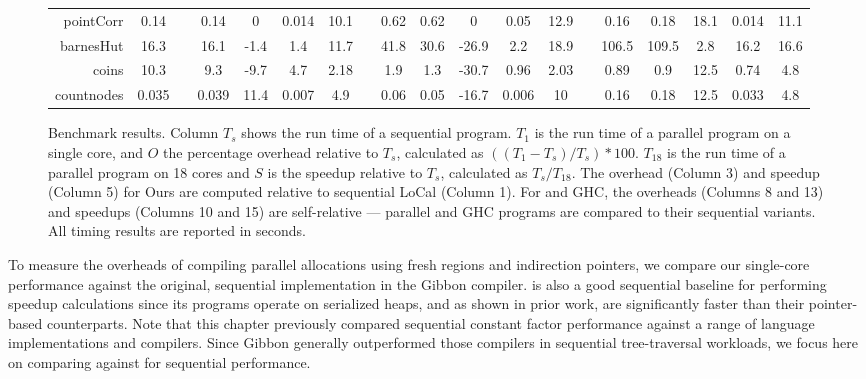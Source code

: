 \begin{figure}
\begin{tabular}{@{}r cc cccc r ccccc r ccccc@{}}
    pointCorr & 0.14 && 0.14 & 0 & 0.014 & 10.1 && 0.62 & 0.62 & 0 & 0.05 & 12.9 && 0.16 & 0.18 & 18.1 & 0.014 & 11.1 \\

    barnesHut & 16.3 && 16.1 & -1.4 & 1.4 & 11.7 && 41.8 & 30.6 & -26.9 & 2.2 & 18.9 && 106.5 & 109.5 & 2.8 & 16.2 & 16.6 \\

    coins & 10.3 && 9.3 & -9.7 & 4.7 & 2.18 && 1.9 & 1.3 & -30.7 & 0.96 & 2.03 && 0.89 & 0.9 & 12.5 & 0.74 & 4.8 \\

    countnodes & 0.035 && 0.039 & 11.4 & 0.007 & 4.9 && 0.06 & 0.05 & -16.7 & 0.006 & 10 && 0.16 & 0.18 & 12.5 & 0.033 & 4.8 \\

    \bottomrule
  \end{tabular}
  \vspace{2mm}
  \normalsize
  \caption{
    Benchmark results.
    Column $T_s$ shows the run time of a sequential program.
    $T_1$ is the run time of a parallel program on a single core, and
    $O$ the percentage overhead relative to $T_s$, calculated as
    $((T_1 - T_s) / T_s) * 100$.
    $T_{18}$ is the run time of a parallel program on 18 cores and
    $S$ is the speedup relative to $T_s$, calculated as $T_s / T_{18}$.
    The overhead (Column 3) and speedup (Column 5) for Ours are
    computed relative to sequential LoCal (Column 1).
    For \MPL{} and GHC, the overheads (Columns 8 and 13) and speedups (Columns 10 and 15)
    are self-relative ---
    parallel \MPL{} and GHC programs are compared to their sequential variants.
    All timing results are reported in seconds.
  }
  \label{fig:benchmark-results}
\end{figure}

To measure the overheads of compiling parallel allocations using
fresh regions and indirection pointers, we compare our single-core performance
against the original, sequential \ourcalc{} implementation in the Gibbon compiler.
%
\ourcalc{} is also a good sequential baseline for performing speedup calculations
since its programs operate on serialized heaps, and
as shown in prior work, are significantly faster than their pointer-based counterparts.
%
Note that this chapter previously compared sequential constant factor performance
against a range of language implementations and compilers.
Since Gibbon generally
outperformed those compilers in sequential tree-traversal workloads, we focus
here on comparing against \ourcalc{} for sequential performance.

